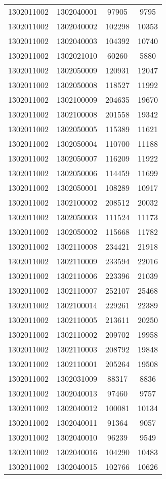 \begin{longtable}{llcc}
1302011002 & 1302040001 & 97905 & 9795\\
1302011002 & 1302040002 & 102298 & 10353\\
1302011002 & 1302040003 & 104392 & 10740\\
1302011002 & 1302021010 & 60260 & 5880\\
1302011002 & 1302050009 & 120931 & 12047\\
1302011002 & 1302050008 & 118527 & 11992\\
1302011002 & 1302100009 & 204635 & 19670\\
1302011002 & 1302100008 & 201558 & 19342\\
1302011002 & 1302050005 & 115389 & 11621\\
1302011002 & 1302050004 & 110700 & 11188\\
1302011002 & 1302050007 & 116209 & 11922\\
1302011002 & 1302050006 & 114459 & 11699\\
1302011002 & 1302050001 & 108289 & 10917\\
1302011002 & 1302100002 & 208512 & 20032\\
1302011002 & 1302050003 & 111524 & 11173\\
1302011002 & 1302050002 & 115668 & 11782\\
1302011002 & 1302110008 & 234421 & 21918\\
1302011002 & 1302110009 & 233594 & 22016\\
1302011002 & 1302110006 & 223396 & 21039\\
1302011002 & 1302110007 & 252107 & 25468\\
1302011002 & 1302100014 & 229261 & 22389\\
1302011002 & 1302110005 & 213611 & 20250\\
1302011002 & 1302110002 & 209702 & 19958\\
1302011002 & 1302110003 & 208792 & 19848\\
1302011002 & 1302110001 & 205264 & 19508\\
1302011002 & 1302031009 & 88317 & 8836\\
1302011002 & 1302040013 & 97460 & 9757\\
1302011002 & 1302040012 & 100081 & 10134\\
1302011002 & 1302040011 & 91364 & 9057\\
1302011002 & 1302040010 & 96239 & 9549\\
1302011002 & 1302040016 & 104290 & 10483\\
1302011002 & 1302040015 & 102766 & 10626\\

\end{longtable}

